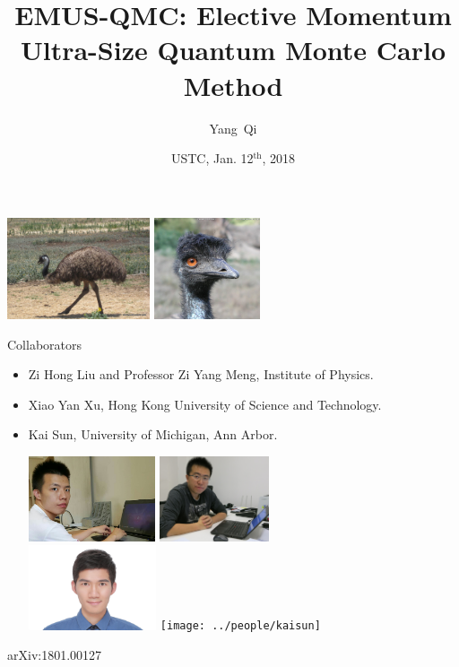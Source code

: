\documentclass[xcolor=table, 10pt, aspectratio=43]{beamer}
\title[EQMC] %
{EMUS-QMC: Elective Momentum Ultra-Size Quantum Monte Carlo Method}
\author[Y Qi] %
{Yang~Qi}
\institute[Fudan] %
{
Department of Physics, Fudan University.
}
\date{USTC, Jan. 12$^{\text{th}}$, 2018}
\begin{document}
\begin{frame}
  \titlepage
  \begin{center}
    \includegraphics[height=3cm]{emu}
    \includegraphics[height=3cm]{emu2}
  \end{center}
\end{frame}

\begin{frame}{Collaborators}
\begin{itemize}
\item Zi Hong Liu and Professor Zi Yang Meng, Institute of Physics.
\item Xiao Yan Xu, Hong Kong University of Science and Technology.
\item Kai Sun, University of Michigan, Ann Arbor.
\begin{center}
  \includegraphics[height=2.5cm]{../people/zihongliu}
  \includegraphics[height=2.5cm]{../people/ziyangmeng}\\
  \includegraphics[height=2.5cm]{../people/xiaoyanxu}
  \texttt{[image: ../people/kaisun]}
\end{center}
\end{itemize}
\begin{center}
  \small arXiv:1801.00127
\end{center}
\end{frame}
\end{document}
